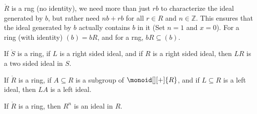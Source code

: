             $\ring{R}$ is a rng (no identity), we need more than just
            $rb$ to characterize the ideal generated by $b$, but rather
            need $nb+rb$ for all $r\in{R}$ and $n\in\mathbb{Z}$. This
            ensures that the ideal generated by $b$ actually contains $b$ in
            it (Set $n=1$ and $x=0$). For a ring (with identity)
            $(b)=bR$, and for a rng, $bR\subseteq(b)$.
            \begin{theorem}
                If $\ring{S}$ is a ring, if $L$ is a right sided ideal,
                and if $R$ is a right sided ideal, then $LR$ is a two sided
                ideal in $S$.
            \end{theorem}
            \begin{theorem}
                If $\ring{R}$ is a ring, if $A\subseteq{R}$ is a subgroup of
                $\monoid[][+]{R}$, and if $L\subseteq{R}$ is a left ideal,
                then $LA$ is a left ideal.
            \end{theorem}
            \begin{theorem}
                If $\ring{R}$ is a ring, then $R^{n}$ is an ideal in $R$.
            \end{theorem}
